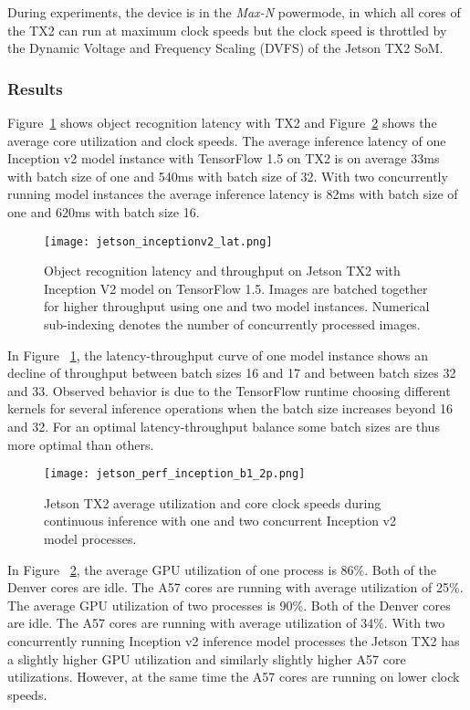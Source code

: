 \documentclass[sigconf]{acmart}
\begin{document}
During experiments, the device is in the \textit{Max-N} powermode, in which all cores of the TX2 can run at maximum clock speeds but the clock speed is throttled by the Dynamic Voltage and Frequency Scaling (DVFS) of the Jetson TX2 SoM.

\subsubsection{Results}

Figure~\ref{fig:jetson_lat} shows object recognition latency with TX2 and Figure~\ref{fig:jetson_perf_inception_p2} shows the average core utilization and clock speeds. The average inference latency of one Inception v2 model instance with TensorFlow 1.5 on TX2 is on average 33ms with batch size of one and 540ms with batch size of 32. With two concurrently running model instances the average inference latency is 82ms with batch size of one and 620ms with batch size 16.

\begin{figure}[t]
\centering
\texttt{[image: jetson\_inceptionv2\_lat.png]}
\caption{Object recognition latency and throughput on Jetson TX2 with Inception V2 model on TensorFlow 1.5. Images are batched together for higher throughput using one and two model instances. Numerical sub-indexing denotes the number of concurrently processed images.}
\label{fig:jetson_lat}
\end{figure}

In Figure ~\ref{fig:jetson_lat}, the latency-throughput curve of one model instance shows an decline of throughput between batch sizes 16 and 17 and between batch sizes 32 and 33. Observed behavior is due to the TensorFlow runtime choosing different kernels for several inference operations when the batch size increases beyond 16 and 32. For an optimal latency-throughput balance some batch sizes are thus more optimal than others.

\begin{figure}[t]
\centering
\texttt{[image: jetson\_perf\_inception\_b1\_2p.png]}
\caption{Jetson TX2 average utilization and core clock speeds during continuous inference with one and two concurrent Inception v2 model processes.}
\label{fig:jetson_perf_inception_p2}
\end{figure}

In Figure ~\ref{fig:jetson_perf_inception_p2}, the average GPU utilization of one process is 86\%. Both of the Denver cores are idle. The A57 cores are running with average utilization of 25\%. The average GPU utilization of two processes is 90\%. Both of the Denver cores are idle. The A57 cores are running with average utilization of 34\%. With two concurrently running Inception v2 inference model processes the Jetson TX2 has a slightly higher GPU utilization and similarly slightly higher A57 core utilizations. However, at the same time the A57 cores are running on lower clock speeds.
\end{document}
